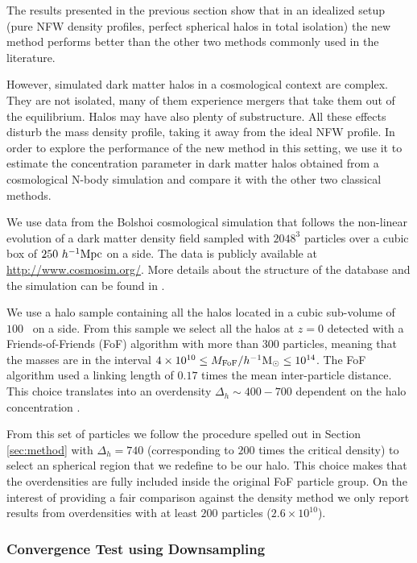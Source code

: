 \documentclass{emulateapj}
\newcommand{\hMpc}{{\ifmmode{h^{-1}{\rm Mpc}}\else{$h^{-1}$Mpc}\fi}}
\newcommand{\hMsun}{{\ifmmode{h^{-1}{\rm {M_{\odot}}}}\else{$h^{-1}{\rm{M_{\odot}}}$}\fi}}
\begin{document}
The results presented in the previous section show that in an
idealized setup (pure NFW density profiles, perfect spherical halos in
total isolation) the new method performs better than the other two
methods commonly used in the literature.

However, simulated dark matter halos in a cosmological context are
complex.  They are not isolated, many of them experience mergers that
take them out of the equilibrium.  Halos may have also plenty of
substructure.  All these effects disturb the mass density profile,
taking it away from the ideal NFW profile.  In order to explore the
performance of the new method in this setting, we use it to estimate
the concentration parameter in dark matter halos obtained from a
cosmological N-body simulation and compare it with the other two
classical methods.
 
We use data from the Bolshoi cosmological simulation that follows the
non-linear evolution of a dark matter density field sampled with
$2048^3$ particles over a cubic box of $250\ \hMpc$ on a side.  The
data is publicly available at \url{http://www.cosmosim.org/}.  More
details about the structure of the database and the simulation can be
found in \citep{2013AN....334..691R}.

We use a halo sample containing all the halos located in a cubic
sub-volume of $100$ \hMpc\ on a side.  From this sample we select all
the halos at $z=0$ detected with a Friends-of-Friends (FoF) algorithm
with more than 300 particles, meaning that the masses are in the
interval $4\times 10^{10}\leq M_{\rm FoF}/\hMsun \leq 10^{14}$.  The
FoF algorithm used a linking length of $0.17$ times the mean
inter-particle distance. This choice translates into an overdensity
$\Delta_h\sim 400-700$ dependent on the halo concentration
\citep{More2011}.

From this set of particles we follow the procedure spelled out in
Section \ref{sec:method} with $\Delta_h=740$ (corresponding to $200$
times the critical density) to select an spherical region that we
redefine to be our halo.  This choice makes that the overdensities are
fully included inside the original FoF particle group.  On the
interest of providing a fair comparison against the density method we
only report results from overdensities with at least $200$ particles
($2.6\times 10^{10}$\hMsun).

\subsubsection{Convergence Test using Downsampling}
\end{document}
